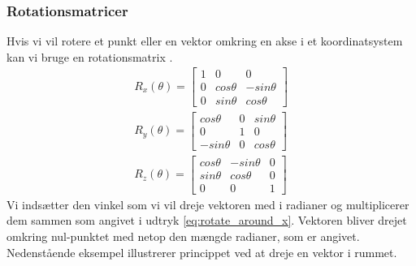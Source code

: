 \subsubsection{Rotationsmatricer}
\label{sec:rot_matricer}
Hvis vi vil rotere et punkt eller en vektor omkring en akse i et koordinatsystem kan vi bruge en rotationsmatrix \cite{rotationsmatricer}.
\begin{align} 
  R_x(\theta) = 
  \begin{bmatrix}
  \label{eq:rotate_around_x}
    1 & 0 & 0\\ 
    0 & cos \theta & - sin \theta\\ 
    0 & sin \theta & cos \theta
  \end{bmatrix}\\
    R_y(\theta) =
  \begin{bmatrix}
    cos \theta  & 0 & sin \theta\\ 
    0           & 1 & 0\\ 
    -sin \theta & 0 & cos \theta
  \end{bmatrix}\\
    R_z(\theta) = 
  \begin{bmatrix}
    cos \theta & - sin \theta & 0\\ 
    sin \theta & cos \theta & 0\\
    0 & 0 & 1
  \end{bmatrix}
\end{align}
Vi indsætter den vinkel som vi vil dreje vektoren med i radianer og multiplicerer dem sammen som angivet i udtryk \ref{eq:rotate_around_x}. Vektoren bliver drejet omkring nul-punktet med netop den mængde radianer, som er angivet.
Nedenstående eksempel illustrerer princippet ved at dreje en vektor i rummet.

